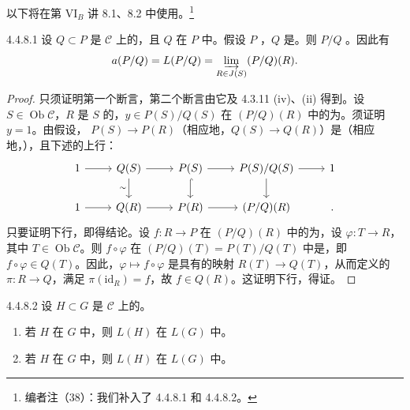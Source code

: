 以下将在第 VI$_B$ 讲 8.1、8.2 中使用。\footnote{编者注（38）：我们补入了 4.4.8.1 和 4.4.8.2。}
\begin{SGAresult}{}{4.4.8.1}
设 $Q\subset P$ 是 $\mathcal C$ 上的，且 $Q$ 在 $P$ 中。假设 $P$ ，$Q$ 是。则 $P/Q$ 。因此有
\[
a(P/Q)=L(P/Q)=\varinjlim_{R\in J(S)}(P/Q)(R).
\]
\end{SGAresult}
\begin{proof}
只须证明第一个断言，第二个断言由它及 4.3.11 (iv)、(ii) 得到。设 $S\in\operatorname{Ob}\mathcal C$，$R$ 是 $S$ 的，$y\in P(S)/Q(S)$ 在 $(P/Q)(R)$ 中的为。须证明 $y=1$。由假设， $P(S)\to P(R)$（相应地，$Q(S)\to Q(R)$）是（相应地，），且下述的上行：
\[
\begin{tikzcd}
1\arrow[r]&Q(S)\arrow[r]\arrow[d,"\sim"']&P(S)\arrow[r]\arrow[d,hook]&P(S)/Q(S)\arrow[r]\arrow[d]&1\\
1\arrow[r]&Q(R)\arrow[r]&P(R)\arrow[r]&(P/Q)(R)&.
\end{tikzcd}
\]
只要证明下行，即得结论。设 $f:R\to P$ 在 $(P/Q)(R)$ 中的为，设 $\varphi:T\to R$，其中 $T\in\operatorname{Ob}\mathcal C$。则 $f\circ\varphi$ 在 $(P/Q)(T)=P(T)/Q(T)$ 中是，即 $f\circ\varphi\in Q(T)$。因此，$\varphi\mapsto f\circ\varphi$ 是具有的映射 $R(T)\to Q(T)$，从而定义的 $\pi:R\to Q$，满足 $\pi(\mathrm{id}_R)=f$，故 $f\in Q(R)$。这证明下行，得证。
\end{proof}
\begin{SGAresult}{}{4.4.8.2}
设 $H\subset G$ 是 $\mathcal C$ 上的。
\begin{enumerate}
\item[(i)] 若 $H$ 在 $G$ 中，则 $L(H)$ 在 $L(G)$ 中。
\item[(ii)] 若 $H$ 在 $G$ 中，则 $L(H)$ 在 $L(G)$ 中。
\end{enumerate}
\end{SGAresult}
